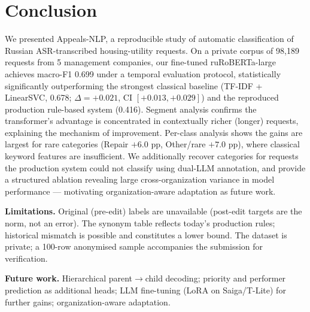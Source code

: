 \documentclass[11pt]{article}
\begin{document}
\section{Conclusion}
We presented Appeals-NLP, a reproducible study of automatic classification of
Russian ASR-transcribed housing-utility requests. On a private corpus of 98{,}189
requests from 5 management companies, our fine-tuned ruRoBERTa-large achieves
macro-F1 0.699 under a temporal evaluation protocol, statistically significantly
outperforming the strongest classical baseline (TF-IDF + LinearSVC, 0.678;
$\Delta{=}{+}0.021$, CI $[{+}0.013,{+}0.029]$) and the reproduced production
rule-based system (0.416). Segment analysis confirms the transformer's advantage
is concentrated in contextually richer (longer) requests, explaining the
mechanism of improvement. Per-class analysis shows the gains are largest for
rare categories (Repair $+6.0$ pp, Other/rare $+7.0$ pp), where classical
keyword features are insufficient. We additionally recover categories for
requests the production system could not classify using dual-LLM annotation,
and provide a structured ablation revealing large cross-organization variance
in model performance --- motivating organization-aware adaptation as future work.

\noindent\textbf{Limitations.}
\label{sec:limits}
Original (pre-edit) labels are unavailable (post-edit targets are the norm,
not an error). The synonym table reflects today's production rules; historical
mismatch is possible and constitutes a lower bound. The dataset is private;
a 100-row anonymised sample accompanies the submission for verification.

\noindent\textbf{Future work.}
\label{sec:future}
Hierarchical parent$\to$child decoding; priority and performer prediction as
additional heads; LLM fine-tuning (LoRA on Saiga/T-Lite) for further gains;
organization-aware adaptation.



\end{document}
